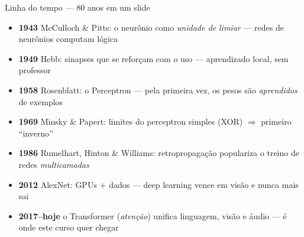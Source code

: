 \documentclass[aspectratio=169, 11pt]{beamer}
\begin{document}
\begin{frame}{Linha do tempo — 80 anos em um slide}
  \begin{itemize}\setlength{\itemsep}{0.2ex}
    \item<1-> {\color{icAzul}\textbf{1943}} McCulloch \& Pitts: o neurônio como
          \emph{unidade de limiar} — redes de neurônios computam lógica
    \item<1-> {\color{icAzul}\textbf{1949}} Hebb: sinapses que se reforçam com o
          uso — aprendizado local, sem professor
    \item<2-> {\color{icAzul}\textbf{1958}} Rosenblatt: o \alert{Perceptron} —
          pela primeira vez, os pesos são \emph{aprendidos} de exemplos
    \item<2-> {\color{icCarmim}\textbf{1969}} Minsky \& Papert: limites do
          perceptron simples (XOR) $\Rightarrow$ primeiro ``inverno''
    \item<3-> {\color{icAzul}\textbf{1986}} Rumelhart, Hinton \& Williams:
          retropropagação populariza o treino de redes \emph{multicamadas}
    \item<3-> {\color{icAzul}\textbf{2012}} AlexNet: GPUs + dados —
          deep learning vence em visão e nunca mais sai
    \item<4-> {\color{icMagenta}\textbf{2017--hoje}} o Transformer
          (\emph{atenção}) unifica linguagem, visão e áudio — é onde este
          curso quer chegar
  \end{itemize}
\end{frame}
\end{document}
